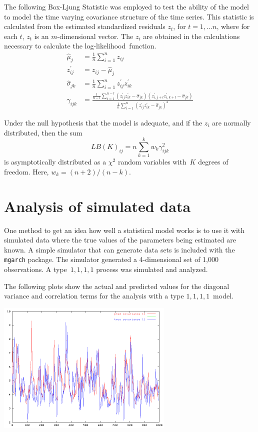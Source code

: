 {The following Box-Ljung
Statistic was employed 
to test the ability of the model to model the time varying covariance
structure of the time series. This statistic is calculated from the
estimated standardized residuals $z_t$, for $t=1,\ldots n$,
where for each $t$, $z_t$ is an $m$-dimensional vector.
The $z_i$ are obtained in the calculations necessary to calculate the
log-likelihood~\mbox{function}.
\begin{align}
  \hat\mu_j&=\frac{1}{ n}\sum_{i=1}^n z_{ij}\\
  z_{ij}^{\prime}&=z_{ij}-\hat\mu_j\\
  \hat\sigma_{jk}&=\frac{1}{ n}\sum_{i=1}^n z_{ij}^\prime z_{ik}^\prime\\
  \gamma_{ijk}&=
       \frac{
            \frac{1}{ n-l}\sum_{i=1}^{n-l}
         (z_{ij}^\prime z_{ik}^\prime-\hat\sigma_{jk})
         (z_{i,j+l}^\prime z_{i,k+l}^\prime-\hat\sigma_{jk})
            }{                              
            \frac{1}{ n}\sum_{i=1}^n
         (z_{ij}^\prime z_{ik}^\prime-\hat\sigma_{jk})^2
       }
\end{align}

Under the null hypothesis that the model is adequate, and if the
$z_i$ are normally distributed, then the sum
$$LB(K)_{ij}=n\sum_{k=1}^k w_k \gamma_{ijk}^2$$
is asymptotically distributed as a $\chi^2$ random variables 
with~$K$ degrees of freedom. Here, $w_k=(n+2)/(n-k)$.


\section{Analysis of simulated data}

One method to get an idea how well a statistical model works is to
use it with simulated data where the true values of the parameters being estimated
are known.
A simple simulator that can generate data sets is included with the
\texttt{mgarch} package. The simulator generated a 4-dimensional set of
1,000 observations. A type~$1,1,1,1$ process was simulated and
analyzed.

The following plots show the actual and predicted values for the
diagonal variance and correlation terms for the analysis with
a type $1,1,1,1$~model.

\includegraphics[height=2.5in, width=\textwidth]{covarplot11.png}



}
